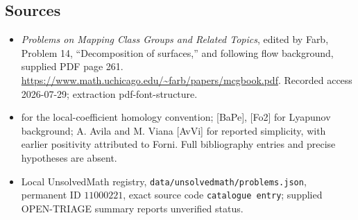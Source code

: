 \documentclass[11pt]{article}
\begin{document}
\subsection{Sources}
\begin{itemize}
\item \emph{Problems on Mapping Class Groups and Related Topics}, edited by Farb, Problem 14, ``Decomposition of surfaces,'' and following flow background, supplied PDF page 261. \url{https://www.math.uchicago.edu/~farb/papers/mcgbook.pdf}. Recorded access 2026-07-29; extraction pdf-font-structure.
\item [MaZo] for the local-coefficient homology convention; [BaPe], [Fo2] for Lyapunov background; A. Avila and M. Viana [AvVi] for reported simplicity, with earlier positivity attributed to Forni. Full bibliography entries and precise hypotheses are absent.
\item Local UnsolvedMath registry, \texttt{data/unsolvedmath/problems.json}, permanent ID \(11000221\), exact source code \texttt{catalogue entry}; supplied OPEN-TRIAGE summary reports unverified status.
\end{itemize}
\end{document}
